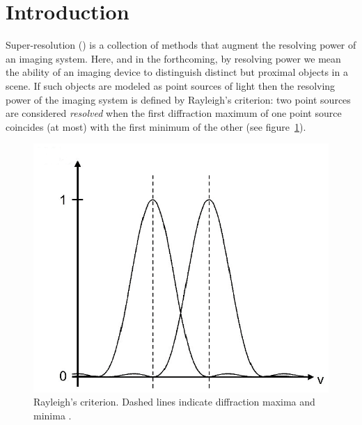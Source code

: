 \section{Introduction}\label{sec:introduction}

Super-resolution () is a collection of methods that augment the resolving power of an imaging system.
%
Here, and in the forthcoming, by resolving power we mean the ability of an imaging device to distinguish distinct but proximal objects in a scene.
%
If such objects are modeled as point sources of light then the resolving power of the imaging system is defined by Rayleigh's criterion: two point sources are considered \textit{resolved} when the first diffraction maximum of one point source coincides (at most) with the first minimum of the other (see figure~\ref{fig:rayleigh}).
\begin{figure}[!htbp]
	\center
	\includegraphics[width=\linewidth,keepaspectratio]{figures/classical/rayleigh.png}
	\caption{Rayleigh's criterion. Dashed lines indicate diffraction maxima and minima \cite{rayleigh}.}
	\label{fig:rayleigh}
\end{figure}

